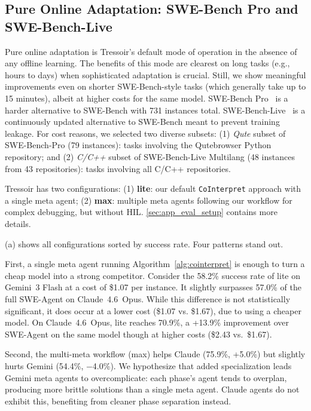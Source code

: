 \subsection{Pure Online Adaptation: SWE-Bench Pro and SWE-Bench-Live}
\label{sec:eval_online}
Pure online adaptation is Tressoir's default mode of operation in the absence of any offline learning. The benefits of this mode are clearest on long tasks (e.g., hours to days) when sophisticated adaptation is crucial. Still, we show meaningful improvements even on shorter SWE-Bench-style tasks (which generally take up to 15 minutes), albeit at higher costs for the same model.
SWE-Bench Pro~\cite{swebenchpro2025} is a harder alternative to SWE-Bench with 731 instances total.
SWE-Bench-Live~\cite{zhang2025swebenchgoeslive} is a continuously updated alternative to SWE-Bench meant to prevent training leakage. For cost reasons, we selected two diverse subsets:
(1) {\em Qute} subset of SWE-Bench-Pro (79 instances): tasks involving the Qutebrowser Python repository;
and (2) {\em C/C++} subset of SWE-Bench-Live Multilang (48 instances from 43 repositories): tasks involving all C/C++ repositories.

Tressoir has two configurations: (1) \textbf{\sysname lite}: our default \texttt{CoInterpret} approach with a single meta agent; (2) \textbf{\sysname max}: multiple meta agents following our workflow for complex debugging, but without HIL. \cref{sec:app_eval_setup} contains more details.

(a) shows all configurations sorted by success rate.
Four patterns stand out.

First, a single meta agent running Algorithm~\ref{alg:cointerpret} is enough to turn a cheap model into a strong competitor. Consider the 58.2\% success rate of \sysname lite on Gemini~3 Flash at a cost of \$1.07 per instance. It slightly surpasses 57.0\% of the full SWE-Agent on Claude~4.6~Opus. While this difference is not statistically significant, it does occur at a lower cost (\$1.07 vs. \$1.67), due to using a cheaper model. On Claude~4.6~Opus, \sysname lite reaches 70.9\%, a +13.9\% improvement over SWE-Agent on the same model though at higher costs (\$2.43 vs.\ \$1.67).

Second, the multi-meta workflow (\sysname max) helps Claude (75.9\%, +5.0\%) but slightly hurts Gemini (54.4\%, $-$4.0\%). We hypothesize that added specialization leads Gemini meta agents to overcomplicate: each phase's agent tends to overplan, producing more brittle solutions than a single meta agent. Claude agents do not exhibit this, benefiting from cleaner phase separation instead.

